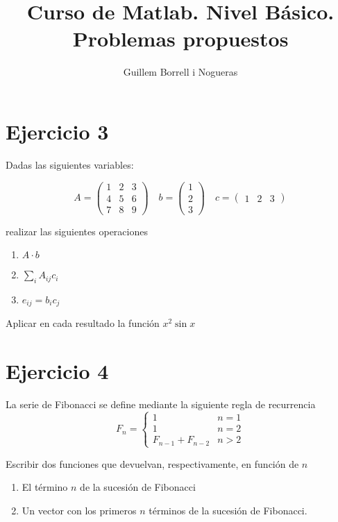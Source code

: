 \documentclass{article}
\title{Curso de Matlab.  Nivel Básico. Problemas propuestos}
\author{Guillem Borrell i Nogueras}
\begin{document}

\maketitle

\section*{Ejercicio 3}
Dadas las siguientes variables:

\[
A = \left( \begin{array}{ccc}
1&2&3\\
4&5&6\\
7&8&9
\end{array} \right) \quad
b = \left( \begin{array}{c}
1\\2\\3
\end{array} \right) \quad
c = \left( \begin{array}{ccc}
1&2&3
\end{array} \right) 
\]

realizar las siguientes operaciones

\begin{enumerate}
\item $A\cdot b$
\item $\sum_i A_{ij}c_i$
\item $e_{ij}=b_ic_j$
\end{enumerate}

Aplicar en cada resultado la función $x^2 \sin x$

\section*{Ejercicio 4}

La serie de Fibonacci se define mediante la siguiente regla de recurrencia\[
F_{n}=\left\{ \begin{array}{cc}
1 & n=1\\
1 & n=2\\
F_{n-1}+F_{n-2} & n>2\end{array}\right.\]

Escribir dos funciones que devuelvan, respectivamente, en función de $n$

\begin{enumerate}
\item El término $n$ de la sucesión de Fibonacci
\item Un vector con los primeros $n$ términos de la sucesión de
  Fibonacci.
\end{enumerate}
\end{document}
